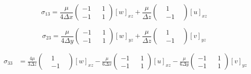 \documentclass{article}
\begin{document}
\begin{equation*}
  \sigma_{13} = \frac{\mu}{4\Delta x}\begin{pmatrix} -1 & & 1 \\ -1 & & 1 \end{pmatrix}[w]_{xz} + \frac{\mu}{\Delta z}\begin{pmatrix} & 1 & \\ & -1 & \end{pmatrix}[u]_{xz}
\end{equation*}

\begin{equation*}
  \sigma_{23} = \frac{\mu}{4\Delta y}\begin{pmatrix} -1 & & 1 \\ -1 & & 1 \end{pmatrix}[w]_{yz} + \frac{\mu}{\Delta z}\begin{pmatrix} & 1 & \\ & -1 & \end{pmatrix}[v]_{yz}
\end{equation*}

\begin{align*}
  \sigma_{33} &= \frac{4\mu}{3\Delta z}\begin{pmatrix} & 1 & \\ & -1 & \end{pmatrix}[w]_{xz} - \frac{\mu}{6\Delta x}\begin{pmatrix} -1 & & 1 \\ -1 & & 1 \end{pmatrix}[u]_{xz} - \frac{\mu}{6\Delta y}\begin{pmatrix} -1 & & 1 \\ -1 & & 1 \end{pmatrix}[v]_{yz}
\end{align*}

\end{document}
